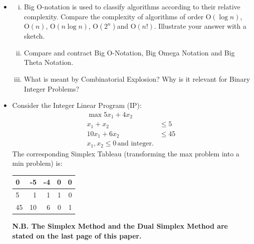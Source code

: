 \documentclass[12pt]{article}
\begin{document}
		\begin{itemize}
	
			
			\item[(a)]
			\begin{enumerate}[(i)]
				\item Big O-notation is used to classify algorithms according to their relative complexity. Compare the complexity of algorithms of order $\mathrm{O}(\log n)$, $\mathrm{O}(n)$, $\mathrm{O}(n\log n)$, $\mathrm{O}(2^n)$and $\mathrm{O}(n!)$. Illustrate your answer with a sketch. 
				\item Compare and contract Big O-Notation, Big Omega Notation and Big Theta Notation. \marks{2 \% }
			
				\item What is meant by Combinatorial Explosion? Why is it relevant for Binary Integer Problems? 
 													
			\end{enumerate}
			
			
	
			\item[(b)]  Consider the Integer Linear Program (IP):
			\begin{eqnarray*}
				\max 5 x_1 +4 x_2\\
				x_1+x_2&\le 5\\
				10x_1+6x_2 &\le 45\\
				x_1, x_2 \le 0 \, \text{and integer.}
			\end{eqnarray*}
The corresponding Simplex Tableau (transforming the max problem into a min problem)  is:
			\begin{center}
			\begin{tabular}[h]{|l|rrrr|}\hline
				0&-5&-4&0&0\\\hline
				5&1&1&1&0\\
				45&10&6&0&1\\\hline
			\end{tabular}
	\end{center}
		
			{\bf N.B. The Simplex Method and the Dual Simplex Method are stated on the last page  of this paper.}
			

\end{itemize}
\end{document}
